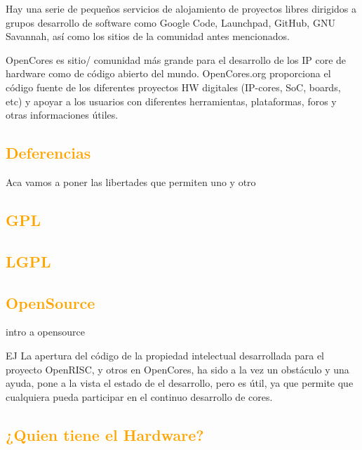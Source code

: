 \documentclass[a4paper,11pt]{article}
\begin{document}
Hay una serie de pequeños servicios de alojamiento de proyectos libres dirigidos a grupos desarrollo de software como Google Code, Launchpad, GitHub, GNU Savannah,
así como los sitios de la comunidad antes mencionados.

OpenCores es  sitio/ comunidad más grande para el desarrollo de los  IP core de hardware como de código abierto del mundo.
OpenCores.org proporciona el código fuente de los diferentes proyectos HW digitales (IP-cores, SoC, boards, etc) y apoyar a los usuarios con diferentes herramientas, plataformas, foros y otras informaciones útiles. 

		\subsection{\textcolor{orange}{Deferencias}}%
Aca vamos a poner las libertades que permiten uno y otro
		\subsection{\textcolor{orange}{GPL}}
		\subsection{\textcolor{orange}{LGPL}}
		\subsection{\textcolor{orange}{OpenSource}}
intro a opensource

EJ
La apertura del código de la propiedad intelectual desarrollada para el proyecto OpenRISC, y otros en OpenCores, ha sido a la vez un obstáculo y una ayuda, pone a la vista el estado de el desarrollo, pero es útil, ya que permite que cualquiera pueda participar en el continuo desarrollo de cores. %
		\subsection{\textcolor{orange}{¿Quien tiene el Hardware?}} 
\end{document}

